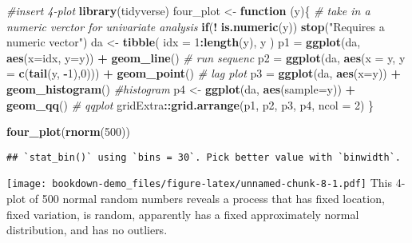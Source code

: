 \documentclass[]{book}
\newenvironment{Shaded}{\begin{snugshade}}{\end{snugshade}}
\newcommand{\KeywordTok}[1]{\textcolor[rgb]{0.13,0.29,0.53}{\textbf{#1}}}
\newcommand{\DataTypeTok}[1]{\textcolor[rgb]{0.13,0.29,0.53}{#1}}
\newcommand{\DecValTok}[1]{\textcolor[rgb]{0.00,0.00,0.81}{#1}}
\newcommand{\StringTok}[1]{\textcolor[rgb]{0.31,0.60,0.02}{#1}}
\newcommand{\CommentTok}[1]{\textcolor[rgb]{0.56,0.35,0.01}{\textit{#1}}}
\newcommand{\ControlFlowTok}[1]{\textcolor[rgb]{0.13,0.29,0.53}{\textbf{#1}}}
\newcommand{\OperatorTok}[1]{\textcolor[rgb]{0.81,0.36,0.00}{\textbf{#1}}}
\newcommand{\NormalTok}[1]{#1}
\theoremstyle{definition}
\theoremstyle{definition}
\theoremstyle{definition}
\theoremstyle{remark}
\begin{document}
\begin{Shaded}
\begin{Highlighting}[]
\CommentTok{#insert 4-plot}
\KeywordTok{library}\NormalTok{(tidyverse)}
\NormalTok{four_plot <-}\StringTok{ }\ControlFlowTok{function}\NormalTok{ (y)\{}
  \CommentTok{# take in a numeric verctor for univariate analysis}
  \ControlFlowTok{if}\NormalTok{(}\OperatorTok{!}\StringTok{ }\KeywordTok{is.numeric}\NormalTok{(y)) }\KeywordTok{stop}\NormalTok{(}\StringTok{"Requires a numeric vector"}\NormalTok{)}
\NormalTok{  da <-}\StringTok{ }\KeywordTok{tibble}\NormalTok{( }\DataTypeTok{idx =} \DecValTok{1}\OperatorTok{:}\KeywordTok{length}\NormalTok{(y), y )}
\NormalTok{  p1 =}\StringTok{ }\KeywordTok{ggplot}\NormalTok{(da, }\KeywordTok{aes}\NormalTok{(}\DataTypeTok{x=}\NormalTok{idx, }\DataTypeTok{y=}\NormalTok{y)) }\OperatorTok{+}\StringTok{ }\KeywordTok{geom_line}\NormalTok{() }\CommentTok{# run sequenc}
\NormalTok{  p2 =}\StringTok{ }\KeywordTok{ggplot}\NormalTok{(da, }\KeywordTok{aes}\NormalTok{(}\DataTypeTok{x =}\NormalTok{ y, }\DataTypeTok{y =} \KeywordTok{c}\NormalTok{(}\KeywordTok{tail}\NormalTok{(y, }\OperatorTok{-}\DecValTok{1}\NormalTok{),}\DecValTok{0}\NormalTok{))) }\OperatorTok{+}\StringTok{ }\KeywordTok{geom_point}\NormalTok{() }\CommentTok{# lag plot}
\NormalTok{  p3 =}\StringTok{ }\KeywordTok{ggplot}\NormalTok{(da, }\KeywordTok{aes}\NormalTok{(}\DataTypeTok{x=}\NormalTok{y)) }\OperatorTok{+}\StringTok{ }\KeywordTok{geom_histogram}\NormalTok{() }\CommentTok{#histogram}
\NormalTok{  p4 <-}\StringTok{ }\KeywordTok{ggplot}\NormalTok{(da, }\KeywordTok{aes}\NormalTok{(}\DataTypeTok{sample=}\NormalTok{y)) }\OperatorTok{+}\StringTok{ }\KeywordTok{geom_qq}\NormalTok{() }\CommentTok{# qqplot}
\NormalTok{  gridExtra}\OperatorTok{::}\KeywordTok{grid.arrange}\NormalTok{(p1, p2, p3, p4, }\DataTypeTok{ncol =} \DecValTok{2}\NormalTok{)}
\NormalTok{\}}

\KeywordTok{four_plot}\NormalTok{(}\KeywordTok{rnorm}\NormalTok{(}\DecValTok{500}\NormalTok{))}
\end{Highlighting}
\end{Shaded}

\begin{verbatim}
## `stat_bin()` using `bins = 30`. Pick better value with `binwidth`.
\end{verbatim}

\texttt{[image: bookdown-demo\_files/figure-latex/unnamed-chunk-8-1.pdf]}
This 4-plot of 500 normal random numbers reveals a process that has
fixed location, fixed variation, is random, apparently has a fixed
approximately normal distribution, and has no outliers.
\end{document}
